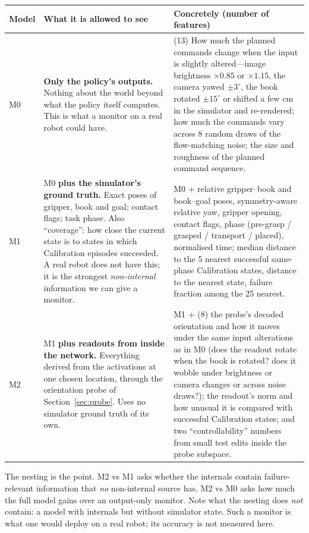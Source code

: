 \documentclass[11pt,a4paper]{article}
\newcommand{\Mz}{M0}\newcommand{\Mo}{M1}\newcommand{\Mt}{M2}
\begin{document}
\begin{center}\small
\begin{tabular}{p{}p{}p{}}
\toprule
Model & What it is allowed to see & Concretely (number of features) \\
\midrule
\Mz{} & \textbf{Only the policy's outputs.} Nothing about the world beyond what the policy itself computes. This is what a monitor on a real robot could have. & (13) How much the planned commands change when the input is slightly altered---image brightness $\times 0.85$ or $\times 1.15$, the camera yawed $\pm 3^\circ$, the book rotated $\pm 15^\circ$ or shifted a few cm in the simulator and re-rendered; how much the commands vary across 8 random draws of the flow-matching noise; the size and roughness of the planned command sequence. \\
\addlinespace
\Mo{} & \Mz{} \textbf{plus the simulator's ground truth.} Exact poses of gripper, book and goal; contact flags; task phase. Also ``coverage'': how close the current state is to states in which Calibration episodes succeeded. A real robot does not have this; it is the strongest \emph{non-internal} information we can give a monitor. & \Mz{} + relative gripper--book and book--goal poses, symmetry-aware relative yaw, gripper opening, contact flags, phase (pre-grasp / grasped / transport / placed), normalised time; median distance to the 5 nearest successful same-phase Calibration states, distance to the nearest state, failure fraction among the 25 nearest. \\
\addlinespace
\Mt{} & \Mo{} \textbf{plus readouts from inside the network.} Everything derived from the activations at one chosen location, through the orientation probe of Section~\ref{sec:probe}. Uses no simulator ground truth of its own. & \Mo{} + (8) the probe's decoded orientation and how it moves under the same input alterations as in \Mz{} (does the readout rotate when the book is rotated? does it wobble under brightness or camera changes or across noise draws?); the readout's norm and how unusual it is compared with successful Calibration states; and two ``controllability'' numbers from small test edits inside the probe subspace. \\
\bottomrule
\end{tabular}
\end{center}

The nesting is the point. \Mt{} vs \Mo{} asks whether the internals contain failure-relevant information that \emph{no} non-internal source has. \Mt{} vs \Mz{} asks how much the full model gains over an output-only monitor. Note what the nesting does \emph{not} contain: a model with internals but without simulator state. Such a monitor is what one would deploy on a real robot; its accuracy is not measured here.
\end{document}
